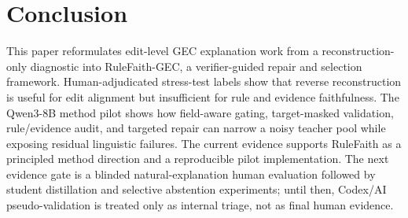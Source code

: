 \section{Conclusion}

This paper reformulates edit-level GEC explanation work from a reconstruction-only diagnostic into RuleFaith-GEC, a verifier-guided repair and selection framework. Human-adjudicated stress-test labels show that reverse reconstruction is useful for edit alignment but insufficient for rule and evidence faithfulness. The Qwen3-8B method pilot shows how field-aware gating, target-masked validation, rule/evidence audit, and targeted repair can narrow a noisy teacher pool while exposing residual linguistic failures. The current evidence supports RuleFaith as a principled method direction and a reproducible pilot implementation. The next evidence gate is a blinded natural-explanation human evaluation followed by student distillation and selective abstention experiments; until then, Codex/AI pseudo-validation is treated only as internal triage, not as final human evidence.
